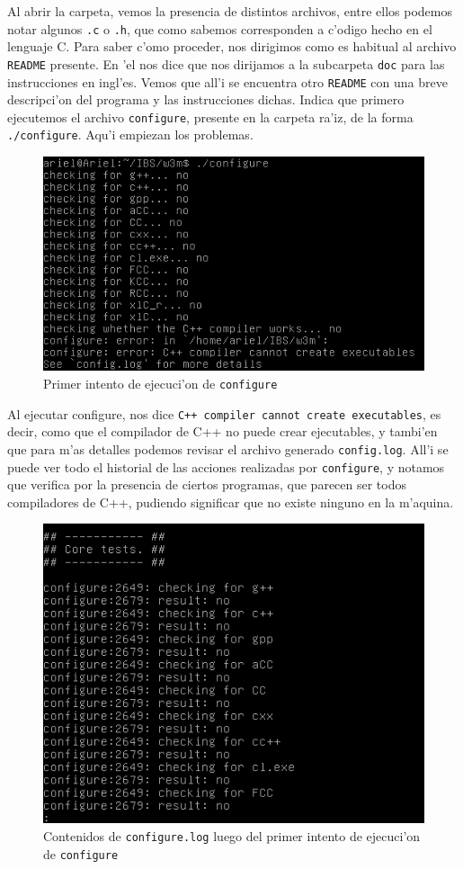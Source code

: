 \documentclass[11pt]{article}
\begin{document}
	Al abrir la carpeta, vemos la presencia de distintos archivos, entre ellos podemos notar algunos \texttt{.c} o \texttt{.h}, que como sabemos corresponden a c'odigo hecho en el lenguaje C. Para saber c'omo proceder, nos dirigimos como es habitual al archivo \texttt{README} presente. En 'el nos dice que nos dirijamos a la subcarpeta \texttt{doc} para las instrucciones en ingl'es. Vemos que all'i se encuentra otro \texttt{README} con una breve descripci'on del programa y las instrucciones dichas. Indica que primero ejecutemos el archivo \texttt{configure}, presente en la carpeta ra'iz, de la forma \texttt{./configure}. Aqu'i empiezan los problemas.
	
	\begin{figure}[H]
		\centering
		\includegraphics[width=.8\linewidth]{Images/Compile_w3m/g++_missing}
		\caption{Primer intento de ejecuci'on de \texttt{configure}}
		\label{fig:g++_missing}
	\end{figure}
	
	Al ejecutar configure, nos dice \texttt{C++ compiler cannot create executables}, es decir, como que el compilador de C++ no puede crear ejecutables, y tambi'en que para m'as detalles podemos revisar el archivo generado \texttt{config.log}. All'i se puede ver todo el historial de las acciones realizadas por \texttt{configure}, y notamos que verifica por la presencia de ciertos programas, que parecen ser todos compiladores de C++, pudiendo significar que no existe ninguno en la m'aquina.
	
	\begin{figure}[H]
		\centering \captionsetup{justification=centering}
		\includegraphics[width=.7\linewidth]{Images/Compile_w3m/g++_missing_log}
		\caption{Contenidos de \texttt{configure.log} luego del primer intento de ejecuci'on de \texttt{configure}}
		\label{fig:g++_missing_log}
	\end{figure}
	
\end{document}
